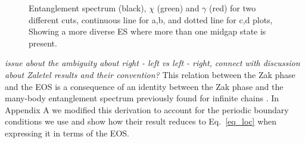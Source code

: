 \documentclass[twocolumn,amsmath,longbibliography,amssymb,superscriptaddress]{revtex4-1}
\newcommand{\mariac}[1]{{\it\color{cyan}#1}}
\begin{document}
\begin{figure}[h!]
	\centering
	\hspace{0mm}
	
	\caption{Entanglement spectrum (black), $\chi$ (green) and $\gamma$ (red) for two different cuts,  continuous line for a,b, and dotted line for c,d plots, Showing a more diverse ES where more than one midgap state is present. }
	\label{2}
\end{figure}

\mariac{issue about  the ambiguity about right - left vs left - right, connect with discussion about Zaletel results and their convention?}
This relation between the Zak phase and the EOS is a consequence of an identity between the Zak phase and the many-body entanglement spectrum previously found for infinite chains \cite{Zaletel2014}. In Appendix A we modified this derivation to account for the periodic boundary conditions we use and show how their result reduces to Eq.~\eqref{eq_loc} when expressing it in terms of the EOS.
\end{document}
